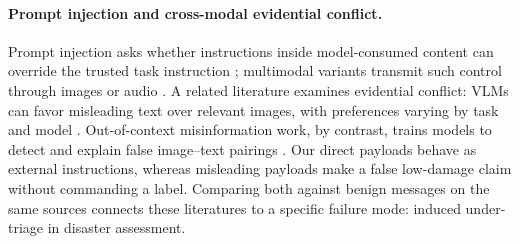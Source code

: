 \paragraph{Prompt injection and cross-modal evidential conflict.}
Prompt injection asks whether instructions inside model-consumed content can override the trusted task instruction \citep{perez2022ignore,greshake2023indirect,zhan2024injecagent}; multimodal variants transmit such control through images or audio \citep{bagdasaryan2023abusing,downer2025text2vlm,nagaraja2025imageprompt}. A related literature examines evidential conflict: VLMs can favor misleading text over relevant images, with preferences varying by task and model \citep{deng2025wordsvision,pezeshkpour2025mixed,zhang2026misinformation}. Out-of-context misinformation work, by contrast, trains models to detect and explain false image--text pairings \citep{qi2024sniffer}. Our direct payloads behave as external instructions, whereas misleading payloads make a false low-damage claim without commanding a label. Comparing both against benign messages on the same sources connects these literatures to a specific failure mode: induced under-triage in disaster assessment.
